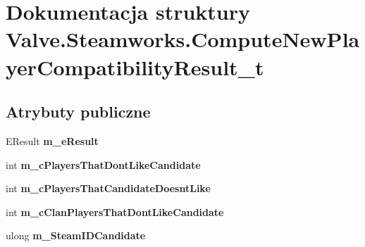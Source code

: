\hypertarget{struct_valve_1_1_steamworks_1_1_compute_new_player_compatibility_result__t}{}\section{Dokumentacja struktury Valve.\+Steamworks.\+Compute\+New\+Player\+Compatibility\+Result\+\_\+t}
\label{struct_valve_1_1_steamworks_1_1_compute_new_player_compatibility_result__t}
\subsection*{Atrybuty publiczne}
\begin{DoxyCompactItemize}
\item 
\mbox{\label{struct_valve_1_1_steamworks_1_1_compute_new_player_compatibility_result__t_a8927d17b5e1a9405eb4ccd729f132edb}} 
E\+Result {\bfseries m\+\_\+e\+Result}
\item 
\mbox{\label{struct_valve_1_1_steamworks_1_1_compute_new_player_compatibility_result__t_af229f8e0027244dede1e22a4323c0cdb}} 
int {\bfseries m\+\_\+c\+Players\+That\+Dont\+Like\+Candidate}
\item 
\mbox{\label{struct_valve_1_1_steamworks_1_1_compute_new_player_compatibility_result__t_a90e417b72425ce953870503ab015d6c8}} 
int {\bfseries m\+\_\+c\+Players\+That\+Candidate\+Doesnt\+Like}
\item 
\mbox{\label{struct_valve_1_1_steamworks_1_1_compute_new_player_compatibility_result__t_a5d539985aae3900518afd54b84f4fd31}} 
int {\bfseries m\+\_\+c\+Clan\+Players\+That\+Dont\+Like\+Candidate}
\item 
\mbox{\label{struct_valve_1_1_steamworks_1_1_compute_new_player_compatibility_result__t_a676a38a7f511c1780f549c48db8b396c}} 
ulong {\bfseries m\+\_\+\+Steam\+I\+D\+Candidate}
\end{DoxyCompactItemize}


